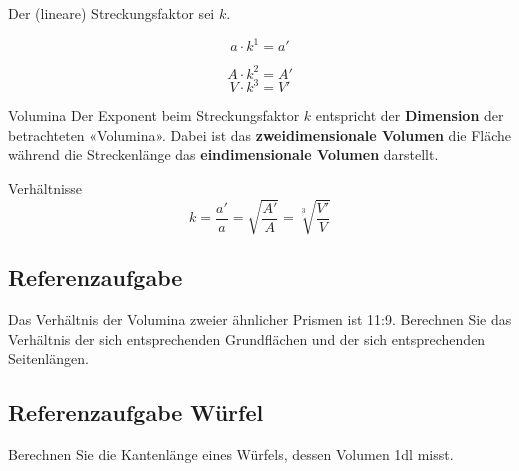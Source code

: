 \begin{gesetz}{}{}
  Der (lineare) Streckungsfaktor sei $k$.

  $$a \cdot{} k^1 = a'$$

  $$A \cdot{} k^2 = A'$$
  $$V \cdot{} k^3 = V'$$
\end{gesetz}

\begin{bemerkung}{Volumina}{}
Der Exponent beim Streckungsfaktor $k$ entspricht der \textbf{Dimension} der
betrachteten «Volumina». Dabei ist das \textbf{zweidimensionale Volumen} die
Fläche während die Streckenlänge das \textbf{eindimensionale Volumen} darstellt.
\end{bemerkung}

\begin{bemerkung}{Verhältnisse}{}
  $$k = \frac{a'}{a} = \sqrt{\frac{A'}{A}} = \sqrt[3\,\,\,]{\frac{V'}{V}}$$
\end{bemerkung}
\newpage


\subsection{Referenzaufgabe}
Das Verhältnis der Volumina zweier ähnlicher Prismen ist
11:9. Berechnen Sie das Verhältnis der sich entsprechenden Grundflächen und
der sich entsprechenden Seitenlängen.


\subsection{Referenzaufgabe Würfel}
Berechnen Sie die Kantenlänge eines Würfels, dessen Volumen 1dl misst.


\newpage
